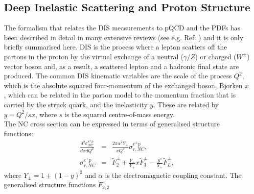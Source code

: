 


\subsection{Deep Inelastic Scattering and Proton Structure}
\label{dissection}


The for\-ma\-lism that relates the DIS measurements to pQCD and the PDFs has been described
in detail in many extensive reviews (see e.g. Ref. \cite{disbook}) and it is only briefly summarised here.
DIS is the process where a lepton scatters off the partons in the proton
by the virtual exchange of a neutral ($\gamma/Z$) or charged ($W^{\pm}$) vector boson and, as a result, a scattered lepton and a 
hadronic final state are produced.
The common DIS kinematic variables are the scale of the process $Q^2$, which is the absolute squared four-momentum of 
the exchanged boson, Bjorken $x$, 
which can be related in the parton model to 
the momentum fraction that is carried by the struck quark, 
and the inelasticity $y$. These are related by $y=Q^2/sx$, where $s$ is the squared centre-of-mass energy.
\\
%
The NC cross section can be expressed in terms of generalised structure functions:
\begin{eqnarray}
    \frac{d^2\sigma_{NC}^{e^{\pm} p}}{dxdQ^2}&=&\frac{2\pi\alpha^2 Y_{+}}{xQ^4} \sigma_{r,NC}^{e^{\pm} p},\\ 
    \sigma_{r,NC}^{e^{\pm} p}&= &  \tilde F_2^{\pm} \mp \frac{Y_{-}}{Y_{+}}x \tilde F_3^{\pm} - \frac{y^2}{Y_{+}} \tilde F_L^{\pm},
\end{eqnarray}
where  $Y_{\pm} = 1 \pm (1-y)^2$ and $\alpha$ is the electromagnetic coupling constant.
The generalised structure functions $\tilde F_{2,3}$ 
